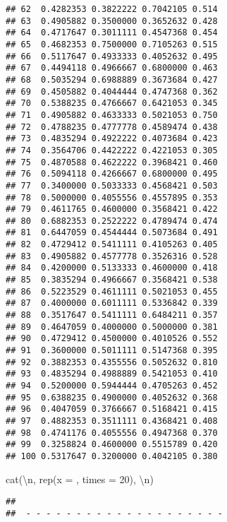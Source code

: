 \documentclass[
]{article}
\newenvironment{Shaded}{\begin{snugshade}}{\end{snugshade}}
\newcommand{\AttributeTok}[1]{\textcolor[rgb]{0.77,0.63,0.00}{#1}}
\newcommand{\DecValTok}[1]{\textcolor[rgb]{0.00,0.00,0.81}{#1}}
\newcommand{\FunctionTok}[1]{\textcolor[rgb]{0.00,0.00,0.00}{#1}}
\newcommand{\NormalTok}[1]{#1}
\newcommand{\SpecialCharTok}[1]{\textcolor[rgb]{0.00,0.00,0.00}{#1}}
\newcommand{\StringTok}[1]{\textcolor[rgb]{0.31,0.60,0.02}{#1}}
\begin{document}
\begin{verbatim}
## 62  0.4282353 0.3822222 0.7042105 0.514
## 63  0.4905882 0.3500000 0.3652632 0.428
## 64  0.4717647 0.3011111 0.4547368 0.454
## 65  0.4682353 0.7500000 0.7105263 0.515
## 66  0.5117647 0.4933333 0.4052632 0.495
## 67  0.4494118 0.4966667 0.6800000 0.463
## 68  0.5035294 0.6988889 0.3673684 0.427
## 69  0.4505882 0.4044444 0.4747368 0.362
## 70  0.5388235 0.4766667 0.6421053 0.345
## 71  0.4905882 0.4633333 0.5021053 0.750
## 72  0.4788235 0.4777778 0.4589474 0.438
## 73  0.4835294 0.4922222 0.4073684 0.423
## 74  0.3564706 0.4422222 0.4221053 0.305
## 75  0.4870588 0.4622222 0.3968421 0.460
## 76  0.5094118 0.4266667 0.6800000 0.495
## 77  0.3400000 0.5033333 0.4568421 0.503
## 78  0.5000000 0.4055556 0.4557895 0.353
## 79  0.4611765 0.4600000 0.3568421 0.422
## 80  0.6882353 0.2522222 0.4789474 0.474
## 81  0.6447059 0.4544444 0.5073684 0.491
## 82  0.4729412 0.5411111 0.4105263 0.405
## 83  0.4905882 0.4577778 0.3526316 0.528
## 84  0.4200000 0.5133333 0.4600000 0.418
## 85  0.3835294 0.4966667 0.3568421 0.538
## 86  0.5223529 0.4611111 0.5021053 0.455
## 87  0.4000000 0.6011111 0.5336842 0.339
## 88  0.3517647 0.5411111 0.6484211 0.357
## 89  0.4647059 0.4000000 0.5000000 0.381
## 90  0.4729412 0.4500000 0.4010526 0.552
## 91  0.3600000 0.5011111 0.5147368 0.395
## 92  0.3882353 0.4355556 0.5052632 0.810
## 93  0.4835294 0.4988889 0.5421053 0.410
## 94  0.5200000 0.5944444 0.4705263 0.452
## 95  0.6388235 0.4900000 0.4052632 0.368
## 96  0.4047059 0.3766667 0.5168421 0.415
## 97  0.4882353 0.3511111 0.4368421 0.408
## 98  0.4741176 0.4055556 0.4947368 0.370
## 99  0.3258824 0.4600000 0.5515789 0.420
## 100 0.5317647 0.3200000 0.4042105 0.380
\end{verbatim}

\begin{Shaded}
\begin{Highlighting}[]
\FunctionTok{cat}\NormalTok{(}\StringTok{\textquotesingle{}}\SpecialCharTok{\textbackslash{}n}\StringTok{\textquotesingle{}}\NormalTok{, }\FunctionTok{rep}\NormalTok{(}\AttributeTok{x =} \StringTok{\textquotesingle{}{-}\textquotesingle{}}\NormalTok{, }\AttributeTok{times =} \DecValTok{20}\NormalTok{), }\StringTok{\textquotesingle{}}\SpecialCharTok{\textbackslash{}n}\StringTok{\textquotesingle{}}\NormalTok{)}
\end{Highlighting}
\end{Shaded}

\begin{verbatim}
## 
##  - - - - - - - - - - - - - - - - - - - -
\end{verbatim}
\end{document}
